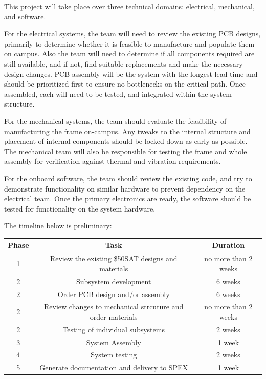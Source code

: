 \documentclass[conference]{IEEEtran} %
\begin{document}
This project will take place over three technical domains: electrical, mechanical, and software.

For the electrical systems, the team will need to review the existing PCB designs, primarily to determine whether it is feasible to manufacture and populate them on campus.
Also the team will need to determine if all components required are still available, and if not, find suitable replacements and make the necessary design changes.
PCB assembly will be the system with the longest lead time and should be prioritized first to ensure no bottlenecks on the critical path.
Once assembled, each will need to be tested, and integrated within the system structure.

For the mechanical systems, the team should evaluate the feasibility of manufacturing the frame on-campus.
Any tweaks to the internal structure and placement of internal components should be locked down as early as possible.
The mechanical team will also be responsible for testing the frame and whole assembly for verification against thermal and vibration requirements.

For the onboard software, the team should review the existing code, and try to demonstrate functionality on similar hardware to prevent dependency on the electrical team.
Once the primary electronics are ready, the software should be tested for functionality on the system hardware.

The timeline below is preliminary:

\begin{table}
\centering
 \begin{tabular}{|c | c | c|}
 \hline
 Phase & Task & Duration \\ [0.5ex]
 \hline\hline
 1 & Review the existing \$50SAT designs and materials &  no more than 2 weeks \\
 \hline
 2 & Subsystem development & 6 weeks \\
 \hline
 2 & Order PCB design and/or assembly & 6 weeks \\
 \hline
 2 & Review changes to mechanical strcuture and order materials & no more than 2 weeks \\
 \hline
 2 & Testing of individual subsystems & 2 weeks \\
 \hline
 3 & System Assembly & 1 week  \\
 \hline
 4 & System testing & 2 weeks  \\
 \hline
 5 & Generate documentation and delivery to SPEX & 1 week  \\
 \hline
\end{tabular}
\label{tab:timeline}
\end{table}
\end{document}
